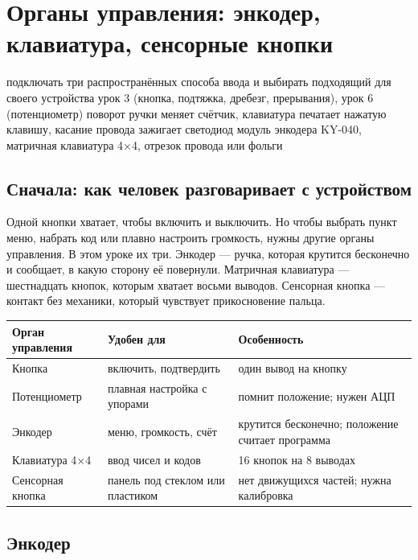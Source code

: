 \section{Органы управления: энкодер, клавиатура, сенсорные кнопки}
\lessonintro
  {подключать три распространённых способа ввода и выбирать подходящий для своего устройства}
  {урок 3 (кнопка, подтяжка, дребезг, прерывания), урок 6 (потенциометр)}
  {поворот ручки меняет счётчик, клавиатура печатает нажатую клавишу, касание провода зажигает светодиод}
  {модуль энкодера KY-040, матричная клавиатура 4×4, отрезок провода или фольги}

\subsection{Сначала: как человек разговаривает с устройством}

Одной кнопки хватает, чтобы включить и выключить. Но чтобы выбрать пункт меню, набрать код или
плавно настроить громкость, нужны другие органы управления. В этом уроке их три. Энкодер --- ручка,
которая крутится бесконечно и сообщает, в какую сторону её повернули. Матричная клавиатура ---
шестнадцать кнопок, которым хватает восьми выводов. Сенсорная кнопка --- контакт без механики, который
чувствует прикосновение пальца.

\begin{center}\small
\begin{tabularx}{\textwidth}{@{}l X X@{}}
\toprule
Орган управления & Удобен для & Особенность \\
\midrule
Кнопка & включить, подтвердить & один вывод на кнопку \\
Потенциометр & плавная настройка с упорами & помнит положение; нужен АЦП \\
Энкодер & меню, громкость, счёт & крутится бесконечно; положение считает программа \\
Клавиатура 4×4 & ввод чисел и кодов & 16 кнопок на 8 выводах \\
Сенсорная кнопка & панель под стеклом или пластиком & нет движущихся частей; нужна калибровка \\
\bottomrule
\end{tabularx}
\end{center}

\subsection{Энкодер}

